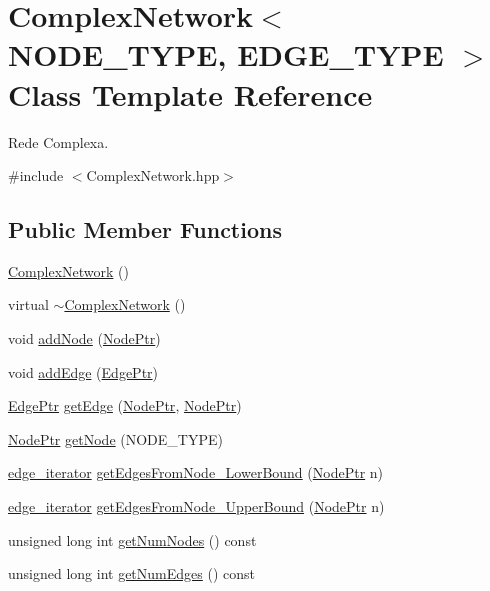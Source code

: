 \hypertarget{class_complex_network}{\section{Complex\+Network$<$ N\+O\+D\+E\+\_\+\+T\+Y\+P\+E, E\+D\+G\+E\+\_\+\+T\+Y\+P\+E $>$ Class Template Reference}
\label{class_complex_network}
}


Rede Complexa.  




{\ttfamily \#include $<$Complex\+Network.\+hpp$>$}

\subsection*{Public Member Functions}
\begin{DoxyCompactItemize}
\item 
\hyperlink{class_complex_network_a8e33a5505e7a856076cd7d982a165348}{Complex\+Network} ()
\item 
virtual \hyperlink{class_complex_network_a266ec2df18b6408115ebd48f0cee9454}{$\sim$\+Complex\+Network} ()
\item 
void \hyperlink{class_complex_network_a87f2a1b087dc3fc8f6cb53c9bda17180}{add\+Node} (\hyperlink{class_complex_network_a1a0d11ddc5f0c146a0e921b58bb5eb3e}{Node\+Ptr})
\item 
void \hyperlink{class_complex_network_a183168090e8d9446b53643890476b0ba}{add\+Edge} (\hyperlink{class_complex_network_af07ec30729e69a40c4c5ac2e98381206}{Edge\+Ptr})
\item 
\hyperlink{class_complex_network_af07ec30729e69a40c4c5ac2e98381206}{Edge\+Ptr} \hyperlink{class_complex_network_a985d6dc543067794c273f18d87592af4}{get\+Edge} (\hyperlink{class_complex_network_a1a0d11ddc5f0c146a0e921b58bb5eb3e}{Node\+Ptr}, \hyperlink{class_complex_network_a1a0d11ddc5f0c146a0e921b58bb5eb3e}{Node\+Ptr})
\item 
\hyperlink{class_complex_network_a1a0d11ddc5f0c146a0e921b58bb5eb3e}{Node\+Ptr} \hyperlink{class_complex_network_aadc448d5bea09ee87263256f85207ef3}{get\+Node} (N\+O\+D\+E\+\_\+\+T\+Y\+P\+E)
\item 
\hyperlink{class_complex_network_af5db8f579c2622ec27f2cfb6835d8466}{edge\+\_\+iterator} \hyperlink{class_complex_network_a2b10b3b8dd87a9b40413b0aadfa22250}{get\+Edges\+From\+Node\+\_\+\+Lower\+Bound} (\hyperlink{class_complex_network_a1a0d11ddc5f0c146a0e921b58bb5eb3e}{Node\+Ptr} n)
\item 
\hyperlink{class_complex_network_af5db8f579c2622ec27f2cfb6835d8466}{edge\+\_\+iterator} \hyperlink{class_complex_network_a652f0a532b1d174a0423d2e98ea22c10}{get\+Edges\+From\+Node\+\_\+\+Upper\+Bound} (\hyperlink{class_complex_network_a1a0d11ddc5f0c146a0e921b58bb5eb3e}{Node\+Ptr} n)
\item 
unsigned long int \hyperlink{class_complex_network_a41d38294467dd4f5aab8e513803e686a}{get\+Num\+Nodes} () const 
\item 
unsigned long int \hyperlink{class_complex_network_a4a4959ddf1ac3a114a46d86bf46e5701}{get\+Num\+Edges} () const 
\end{DoxyCompactItemize}
